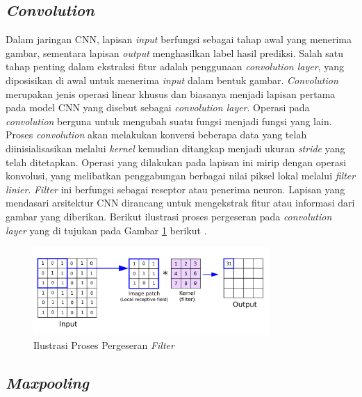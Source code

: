 \subsection{\textit{Convolution}}

    Dalam jaringan CNN, lapisan \textit{input} berfungsi sebagai tahap awal yang menerima gambar, sementara lapisan \textit{output} menghasilkan label hasil prediksi. Salah satu tahap penting dalam ekstraksi fitur adalah penggunaan \textit{convolution layer}, yang diposisikan di awal untuk menerima \textit{input} dalam bentuk gambar. \textit{Convolution} merupakan jenis operasi linear khusus dan biasanya menjadi lapisan
    pertama pada model CNN yang disebut sebagai \textit{convolution layer}. Operasi pada
    \textit{convolution} berguna untuk mengubah suatu fungsi menjadi fungsi yang lain. Proses \textit{convolution} akan melakukan konversi
    beberapa data yang telah diinisialisasikan melalui \textit{kernel} kemudian ditangkap
    menjadi ukuran \textit{stride} yang telah ditetapkan.
    Operasi yang dilakukan pada lapisan ini mirip dengan operasi konvolusi, yang melibatkan penggabungan berbagai nilai piksel lokal melalui \textit{filter linier}. \textit{Filter} ini berfungsi sebagai reseptor atau penerima neuron. Lapisan yang mendasari arsitektur CNN dirancang untuk mengekstrak fitur atau informasi dari gambar yang diberikan. Berikut ilustrasi proses pergeseran pada \textit{convolution layer} yang di tujukan pada Gambar \ref{Ilustrasi Proses Pergeseran Filter Pada Convolutional Layer} berikut \cite{Dewi2018}.

  \begin{figure}[H]
      \centering
      \includegraphics[width=0.8\textwidth]{figures/bab2/cnn.png}
      \caption{Ilustrasi Proses Pergeseran \textit{Filter} \cite{Reynolds}}
      \label{Ilustrasi Proses Pergeseran Filter Pada Convolutional Layer}
    
 \end{figure}


\subsection{\textit{Maxpooling}}

